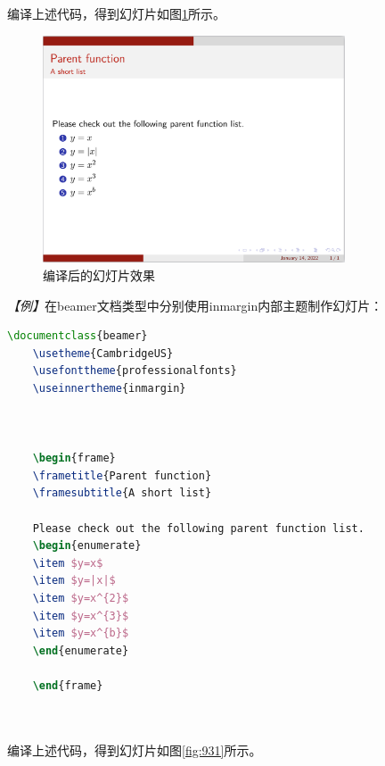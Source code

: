 编译上述代码，得到幻灯片如图\ref{fig:930}所示。

\begin{figure}[htbp]
    \centering
    \includegraphics[width = 0.8\textwidth]{images/ch_9/example_innertheme_circles.png}
    \caption{编译后的幻灯片效果}
    \label{fig:930}
\end{figure}

\emph{【例】}在beamer文档类型中分别使用inmargin内部主题制作幻灯片：
\begin{lstlisting}[language=TeX]
    \documentclass{beamer}
    \usetheme{CambridgeUS}
    \usefonttheme{professionalfonts}
    \useinnertheme{inmargin}

    

    \begin{frame}
    \frametitle{Parent function}
    \framesubtitle{A short list}

    Please check out the following parent function list.
    \begin{enumerate}
    \item $y=x$
    \item $y=|x|$
    \item $y=x^{2}$
    \item $y=x^{3}$
    \item $y=x^{b}$
    \end{enumerate}

    \end{frame}

    
\end{lstlisting}

编译上述代码，得到幻灯片如图\ref{fig:931}所示。

